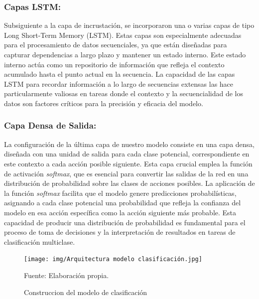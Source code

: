 \subsubsection{Capas LSTM:} 
Subsiguiente a la capa de incrustación, se incorporaron una o varias capas de tipo Long Short-Term Memory (LSTM). Estas capas son especialmente adecuadas para el procesamiento de datos secuenciales, ya que están diseñadas para capturar dependencias a largo plazo y mantener un estado interno. Este estado interno actúa como un repositorio de información que refleja el contexto acumulado hasta el punto actual en la secuencia. La capacidad de las capas LSTM para recordar información a lo largo de secuencias extensas las hace particularmente valiosas en tareas donde el contexto y la secuencialidad de los datos son factores críticos para la precisión y eficacia del modelo.

\subsubsection{Capa Densa de Salida:} 
La configuración de la última capa de nuestro modelo consiste en una capa densa, diseñada con una unidad de salida para cada clase potencial, correspondiente en este contexto a cada acción posible siguiente. Esta capa crucial emplea la función de activación \textit{softmax}, que es esencial para convertir las salidas de la red en una distribución de probabilidad sobre las clases de acciones posibles. La aplicación de la función \textit{softmax} facilita que el modelo genere predicciones probabilísticas, asignando a cada clase potencial una probabilidad que refleja la confianza del modelo en esa acción específica como la acción siguiente más probable. Esta capacidad de producir una distribución de probabilidad es fundamental para el proceso de toma de decisiones y la interpretación de resultados en tareas de clasificación multiclase.
\begin{figure}[H]
    \begin{minipage}[t]{0.9\textwidth}
        \caption{Construccion del modelo de clasificación}
        \label{parquitectura_clasificación}        
    \end{minipage}

    \vspace{10pt}

    \begin{minipage}[b]{1\textwidth}
        \centering
        \texttt{[image: img/Arquitectura modelo clasificación.jpg]}        
    \end{minipage}

    \begin{minipage}[t]{0.9\textwidth}
        Fuente: Elaboración propia.
    \end{minipage}
\end{figure}

